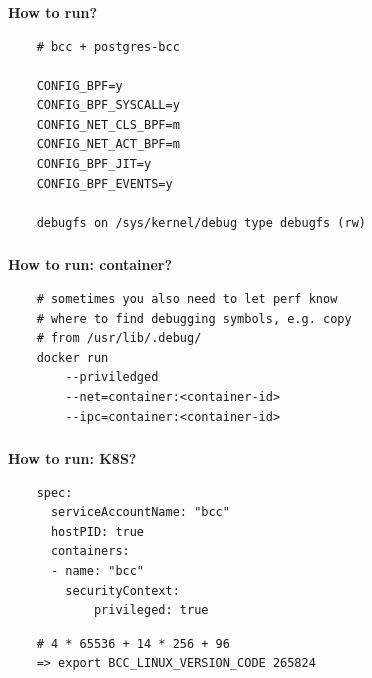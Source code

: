 \documentclass[usenames,dvipsnames, 18pt, compress, aspectratio=169]{beamer}
\begin{document}
\begin{frame}[fragile]{}
    \frametitle{}
    \begin{center}
        \textbf{How to run?}

		\begin{verbatim}
    # bcc + postgres-bcc

    CONFIG_BPF=y
    CONFIG_BPF_SYSCALL=y
    CONFIG_NET_CLS_BPF=m
    CONFIG_NET_ACT_BPF=m
    CONFIG_BPF_JIT=y
    CONFIG_BPF_EVENTS=y

    debugfs on /sys/kernel/debug type debugfs (rw)
        \end{verbatim}

    \end{center}
\end{frame}

\begin{frame}[fragile]{}
    \frametitle{}
    \begin{center}
        \textbf{How to run: container?}

		\begin{verbatim}
    # sometimes you also need to let perf know
    # where to find debugging symbols, e.g. copy
    # from /usr/lib/.debug/
    docker run
        --priviledged
        --net=container:<container-id>
        --ipc=container:<container-id>
        \end{verbatim}

    \end{center}
\end{frame}

\begin{frame}[fragile]{}
    \frametitle{}
    \begin{center}
        \textbf{How to run: K8S?}

        \begin{verbatim}
    spec:
      serviceAccountName: "bcc"
      hostPID: true
      containers:
      - name: "bcc"
        securityContext:
            privileged: true
        \end{verbatim}

		\begin{verbatim}
    # 4 * 65536 + 14 * 256 + 96
    => export BCC_LINUX_VERSION_CODE 265824
        \end{verbatim}

    \end{center}
\end{frame}
\end{document}
